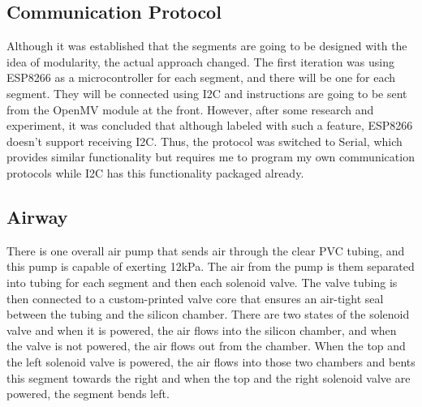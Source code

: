 \documentclass[twoside]{article}
\begin{document}
\subsection{Communication Protocol}
Although it was established that the segments are going to be designed with the idea of modularity, the actual approach changed. The first iteration was using ESP8266 as a microcontroller for each segment, and there will be one for each segment. They will be connected using I2C and instructions are going to be sent from the OpenMV module at the front. However, after some research and experiment, it was concluded that although labeled with such a feature, ESP8266 doesn't support receiving I2C. Thus, the protocol was switched to Serial, which provides similar functionality but requires me to program my own communication protocols while I2C has this functionality packaged already.

\subsection{Airway}
There is one overall air pump that sends air through the clear PVC tubing, and this pump is capable of exerting 12kPa. The air from the pump is them separated into tubing for each segment and then each solenoid valve. The valve tubing is then connected to a custom-printed valve core that ensures an air-tight seal between the tubing and the silicon chamber. There are two states of the solenoid valve and when it is powered, the air flows into the silicon chamber, and when the valve is not powered, the air flows out from the chamber. When the top and the left solenoid valve is powered, the air flows into those two chambers and bents this segment towards the right and when the top and the right solenoid valve are powered, the segment bends left. 
\end{document}
